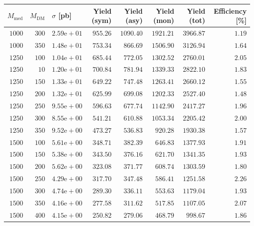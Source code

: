 \begin{table}
    \centering
    {\small
    \begin{tabular}{rrlrrrrr}
    \hline\hline
    $M_{\text{med}}$ & $M_{\text{DM}}$ & $\sigma$ [pb] & Yield (sym) & Yield (asy) & Yield (mon) & Yield (tot) & Efficiency [\%] \\
    \hline
    $1000$ & $300$ & $2.59\text{e}+01$ & $955.26$   & $1090.40$  & $1921.21$  & $3966.87$   & $1.19$ \\
    $1000$ & $350$ & $1.48\text{e}+01$ & $753.34$   & $866.69$   & $1506.90$  & $3126.94$   & $1.64$ \\
    $1250$ & $100$ & $1.04\text{e}+01$ & $685.44$   & $772.05$   & $1302.52$  & $2760.01$   & $2.05$ \\
    $1250$ & $10$  & $1.20\text{e}+01$ & $700.84$   & $781.94$   & $1339.33$  & $2822.10$   & $1.83$ \\
    $1250$ & $150$ & $1.33\text{e}+01$ & $649.22$   & $747.48$   & $1263.41$  & $2660.12$   & $1.55$ \\
    $1250$ & $200$ & $1.32\text{e}+01$ & $625.99$   & $699.08$   & $1202.33$  & $2527.40$   & $1.48$ \\
    $1250$ & $250$ & $9.55\text{e}+00$ & $596.63$   & $677.74$   & $1142.90$  & $2417.27$   & $1.96$ \\
    $1250$ & $300$ & $8.55\text{e}+00$ & $541.21$   & $610.88$   & $1053.34$  & $2205.42$   & $2.00$ \\
    $1250$ & $350$ & $9.52\text{e}+00$ & $473.27$   & $536.83$   & $920.28$   & $1930.38$   & $1.57$ \\
    $1500$ & $100$ & $5.61\text{e}+00$ & $348.71$   & $382.39$   & $646.83$   & $1377.93$   & $1.91$ \\
    $1500$ & $150$ & $5.38\text{e}+00$ & $343.50$   & $376.16$   & $621.70$   & $1341.35$   & $1.93$ \\
    $1500$ & $200$ & $5.62\text{e}+00$ & $323.08$   & $371.77$   & $608.74$   & $1303.59$   & $1.80$ \\
    $1500$ & $250$ & $4.29\text{e}+00$ & $317.70$   & $347.48$   & $586.41$   & $1251.58$   & $2.26$ \\
    $1500$ & $300$ & $4.74\text{e}+00$ & $289.30$   & $336.11$   & $553.63$   & $1179.04$   & $1.93$ \\
    $1500$ & $350$ & $4.16\text{e}+00$ & $277.58$   & $311.62$   & $517.85$   & $1107.05$   & $2.07$ \\
    $1500$ & $400$ & $4.15\text{e}+00$ & $250.82$   & $279.06$   & $468.79$   & $998.67$    & $1.86$ \\

\end{tabular}}
\end{table}
